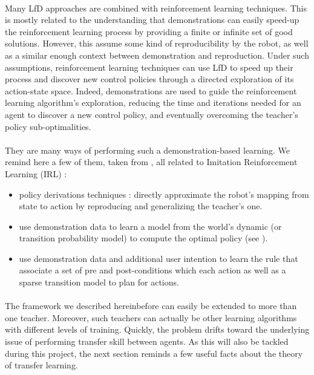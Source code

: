 \documentclass[a4paper]{report}
\begin{document}
{{{				\paragraph{}Many LfD approaches are combined with reinforcement learning techniques. This is mostly related to the understanding that demonstrations can easily speed-up the reinforcement learning process by providing a finite or infinite set of good solutions. However, this assume some kind of reproducibility by the robot, as well as a similar enough context between demonstration and reproduction. \newline
				Under such assumptions, reinforcement learning techniques can use LfD to speed up their process and discover new control policies through a directed exploration of its action-state space. Indeed, demonstrations are used to guide the reinforcement learning algorithm's exploration, reducing the time and iterations needed for an agent to discover a new control policy, and eventually overcoming the teacher's  policy sub-optimalities. 
				
				\paragraph{} They are many ways of performing such a demonstration-based learning. We remind here a few of them, taken from \cite{argall2009survey}, all related to Imitation Reinforcement Learning (IRL) : 
				\begin{itemize}
					\item policy derivations techniques : directly approximate the robot's mapping from state to action by reproducing and generalizing the teacher's one. 
					\item use demonstration data to learn a model from the world's dynamic (or transition probability model) to compute the optimal policy (see \cite{price2003accelerating}). 
					\item use demonstration data and additional user intention to learn the rule that associate a set of pre and post-conditions which each action as well as a sparse transition model to plan for actions. 
				\end{itemize}
				
				\paragraph{} The framework we described hereinbefore can easily be extended to more than one teacher. Moreover, such teachers can actually be other learning algorithms with different levels of training. Quickly, the problem drifts toward the underlying issue of performing transfer skill between agents. As this will also be tackled during this project, the next section reminds a few useful facts about the theory of transfer learning. 
			}
}}
\end{document}

